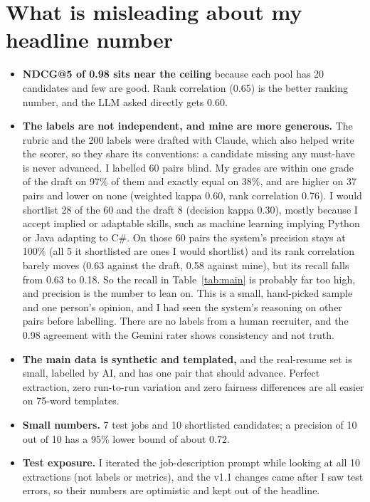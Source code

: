 \documentclass[conference]{styles/acmsiggraph}
\begin{document}
\section{What is misleading about my headline number}

\begin{itemize}
\item \textbf{NDCG@5 of 0.98 sits near the ceiling} because each pool has 20 candidates and few are good. Rank correlation (0.65) is the better ranking number, and the LLM asked directly gets 0.60.
\item \textbf{The labels are not independent, and mine are more generous.} The rubric and the 200 labels were drafted with Claude, which also helped write the scorer, so they share its conventions: a candidate missing any must-have is never advanced. I labelled 60 pairs blind. My grades are within one grade of the draft on 97\% of them and exactly equal on 38\%, and are higher on 37 pairs and lower on none (weighted kappa 0.60, rank correlation 0.76). I would shortlist 28 of the 60 and the draft 8 (decision kappa 0.30), mostly because I accept implied or adaptable skills, such as machine learning implying Python or Java adapting to C\#. On those 60 pairs the system's precision stays at 100\% (all 5 it shortlisted are ones I would shortlist) and its rank correlation barely moves (0.63 against the draft, 0.58 against mine), but its recall falls from 0.63 to 0.18. So the recall in Table~\ref{tab:main} is probably far too high, and precision is the number to lean on. This is a small, hand-picked sample and one person's opinion, and I had seen the system's reasoning on other pairs before labelling. There are no labels from a human recruiter, and the 0.98 agreement with the Gemini rater shows consistency and not truth.



\item \textbf{The main data is synthetic and templated,} and the real-resume set is small, labelled by AI, and has one pair that should advance. Perfect extraction, zero run-to-run variation and zero fairness differences are all easier on 75-word templates.
\item \textbf{Small numbers.} 7 test jobs and 10 shortlisted candidates; a precision of 10 out of 10 has a 95\% lower bound of about 0.72.
\item \textbf{Test exposure.} I iterated the job-description prompt while looking at all 10 extractions (not labels or metrics), and the v1.1 changes came after I saw test errors, so their numbers are optimistic and kept out of the headline.
\end{itemize}
\end{document}
